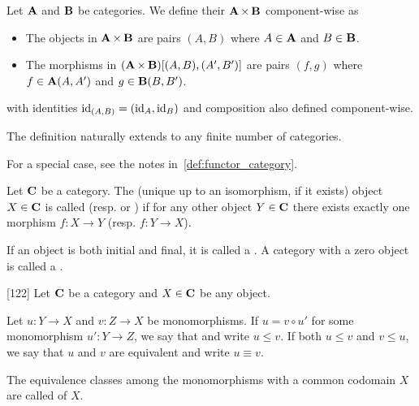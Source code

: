 \begin{definition}\label{def:product_category}\cite[exercise 1.1.14]{Leinster2014}
  Let $\operatorname{\mathbf{A}}$ and $\operatorname{\mathbf{B}}$ be categories. We define their  $\operatorname{\mathbf{A}} \times \operatorname{\mathbf{B}}$ component-wise as
  \begin{itemize}
    \item The objects in $\operatorname{\mathbf{A}} \times \operatorname{\mathbf{B}}$ are pairs $(A, B)$ where $A \in \operatorname{\mathbf{A}}$ and $B \in \operatorname{\mathbf{B}}$.
    \item The morphisms in $(\operatorname{\mathbf{A}} \times \operatorname{\mathbf{B}})[(A, B), (A', B')]$ are pairs $(f, g)$ where $f \in \operatorname{\mathbf{A}}(A, A')$ and $g \in \operatorname{\mathbf{B}}(B, B')$.
  \end{itemize}
  with identities $\operatorname{id}_{(A,B)} =(\operatorname{id}_A, \operatorname{id}_B)$ and composition also defined component-wise.

  The definition naturally extends to any finite number of categories.

  For a special case, see the notes in~\cref{def:functor_category}.
\end{definition}

\begin{definition}\label{def:initial_final_objects}\cite[definitions 2.1.7]{Leinster2014}
  Let $\operatorname{\mathbf{C}}$ be a category. The (unique up to an isomorphism, if it exists) object $X \in \operatorname{\mathbf{C}}$ is called  (resp.  or ) if for any other object $Y \in \operatorname{\mathbf{C}}$ there exists exactly one morphism $f: X \to Y$ (resp. $f: Y \to X$).

  If an object is both initial and final, it is called a . A category with a zero object is called a .
\end{definition}

\begin{definition}\label{def:categorical_subobject}\cite{MacLane1994}[122]
  Let $\operatorname{\mathbf{C}}$ be a category and $X \in \operatorname{\mathbf{C}}$ be any object.

  Let $u: Y \to X$ and $v: Z \to X$ be monomorphisms. If $u = v \circ u'$ for some monomorphism $u': Y \to Z$, we say that  and write $u \leq v$. If both $u \leq v$ and $v \leq u$, we say that $u$ and $v$ are equivalent and write $u \equiv v$.

  The equivalence classes among the monomorphisms with a common codomain $X$ are called  of $X$.
\end{definition}
